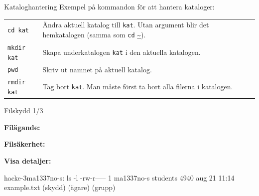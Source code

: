 \begin{Slide}{Kataloghantering}\SlideFontSmall
    Exempel på kommandon för att hantera kataloger:

    \blankline
    \begin{tabular}{lp{8.3cm}}
        \texttt{cd kat}    & Ändra aktuell katalog till \texttt{kat}. Utan argument blir det hemkatalogen (samma som \texttt{cd} \url{~}). \\
        \texttt{mkdir kat} & Skapa underkatalogen \texttt{kat} i den aktuella katalogen.                                                 \\
        \texttt{pwd}       & Skriv ut namnet på aktuell katalog.                                                                       \\
        \texttt{rmdir kat} & Tag bort \texttt{kat}. Man måste först ta bort alla filerna i katalogen.                                    \\
    \end{tabular}
\end{Slide}




\begin{Slide}{Filskydd 1/3}

    \noindent\textbf{Filägande:}
    \begin{itemize}
    \end{itemize}

    \noindent\textbf{Filsäkerhet:}
    \begin{itemize}
    \end{itemize}

    \noindent\textbf{Visa detaljer:}
\begin{Code}[language=]
hacke-3{ma1337no-s}: ls -l
-rw-r-----  1 ma1337no-s  students  4940 aug 21 11:14 example.txt
(skydd)       (ägare)     (grupp)
\end{Code}

\end{Slide}

